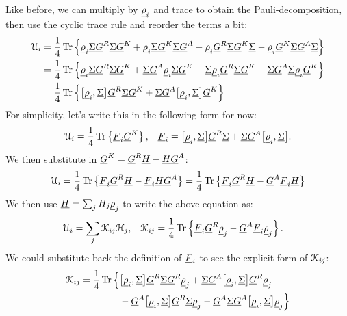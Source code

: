 Like before, we can multiply by ${\U\rho}_i$ and trace to obtain the Pauli-decomposition, then use the cyclic trace rule and reorder the terms a bit:
\begin{align*}
  \C{U}_i
  &= 
    \frac{1}{4}
    \tr 
    \left\{
      {\U\rho}_i {\U\Sigma} {\U G}^R {\U\Sigma} {\U G}^K +
      {\U\rho}_i {\U\Sigma} {\U G}^K {\U\Sigma} {\U G}^A - 
      {\U\rho}_i {\U G}^R {\U\Sigma} {\U G}^K {\U\Sigma} -
      {\U\rho}_i {\U G}^K {\U\Sigma} {\U G}^A {\U\Sigma} 
    \right\}
  \\ 
  &= 
    \frac{1}{4}
    \tr 
    \left\{
      {\U\rho}_i {\U\Sigma} {\U G}^R {\U\Sigma} {\U G}^K +
      {\U\Sigma} {\U G}^A {\U\rho}_i {\U\Sigma} {\U G}^K - 
      {\U\Sigma} {\U\rho}_i {\U G}^R {\U\Sigma} {\U G}^K -
      {\U\Sigma} {\U G}^A {\U\Sigma} {\U\rho}_i {\U G}^K 
    \right\}
  \\ 
  &= 
    \frac{1}{4}
    \tr 
    \left\{
      \big[ {\U\rho}_i, {\U\Sigma} \big] {\U G}^R {\U\Sigma} {\U G}^K +
      {\U\Sigma} {\U G}^A \big[ {\U\rho}_i, {\U\Sigma} \big] {\U G}^K 
    \right\}
\end{align*}
For simplicity, let's write this in the following form for now:
\begin{align}
  \C{U}_i
  &= 
    \frac{1}{4} \tr \left\{ \U F_i {\U G}^K \right\}
  ,
  &
  \U F_i
  = \big[ {\U\rho}_i, {\U\Sigma} \big] {\U G}^R {\U\Sigma} 
  + {\U\Sigma} {\U G}^A \big[ {\U\rho}_i, {\U\Sigma} \big]
  .
\end{align}
We then substitute in ${\U G}^K = {\U G}^R {\U H} - {\U H} {\U G}^A$:
\begin{align}
  \C{U}_i
  = 
    \frac{1}{4}
    \tr 
    \left\{
      {\U F}_i {\U G}^R {\U H} -
      {\U F}_i {\U H} {\U G}^A 
    \right\}
  = 
    \frac{1}{4}
    \tr 
    \left\{
      {\U F}_i {\U G}^R {\U H} -
      {\U G}^A {\U F}_i {\U H}
    \right\}
\end{align}
We then use $\U H = \sum_j H_j {\U\rho}_j$ to write the above equation as:
\begin{align}
  \C{U}_i    &= \sum_j \C{K}_{ij} \C{H}_j, &
  \C{K}_{ij} &= \frac{1}{4} \tr \left\{ {\U F}_i {\U G}^R {\U\rho}_j - {\U G}^A {\U F}_i {\U \rho}_j \right\}.
\end{align}
We could substitute back the definition of ${\U F}_i$ to see the explicit form of $\C{K}_{ij}$:
\begin{align*}
  \C{K}_{ij} = 
  \frac{1}{4} \tr 
  \Big\{
  &   \big[ {\U\rho}_i, {\U\Sigma} \big] {\U G}^R {\U\Sigma} {\U G}^R {\U\rho}_j
    + {\U\Sigma} {\U G}^A \big[ {\U\rho}_i, {\U\Sigma} \big] {\U G}^R {\U\rho}_j \\
  & - {\U G}^A \big[ {\U\rho}_i, {\U\Sigma} \big] {\U G}^R {\U\Sigma} {\U \rho}_j
    - {\U G}^A {\U\Sigma} {\U G}^A \big[ {\U\rho}_i, {\U\Sigma} \big] {\U \rho}_j
  \Big\}
\end{align*}
